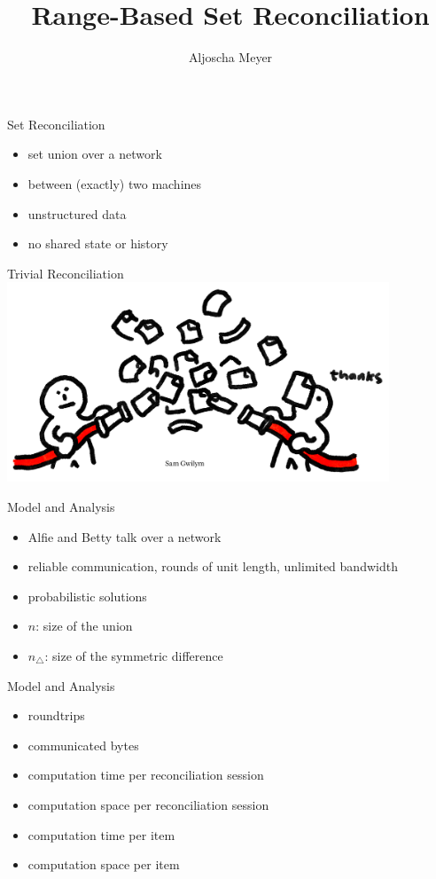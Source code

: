 \documentclass{beamer}
\title[RBSR]{Range-Based Set Reconciliation}
\author{Aljoscha Meyer}
\date{}
\begin{document}
\frame{\titlepage}

\begin{frame}{Set Reconciliation}
    \begin{itemize}
        \item set union over a network
        \item between (exactly) two machines
        \item unstructured data
        \item no shared state or history
    \end{itemize}
\end{frame}

\begin{frame}{Trivial Reconciliation}
    \includegraphics[keepaspectratio=true,width=11.4cm]{trivial_sync.png}
\end{frame}

\begin{frame}{Model and Analysis}
    \begin{itemize}
        \item Alfie and Betty talk over a network
        \item reliable communication, rounds of unit length, unlimited bandwidth
        \item probabilistic solutions \pause
        \item $n$: size of the union
        \item $n_{\triangle}$: size of the symmetric difference
    \end{itemize}
\end{frame}

\begin{frame}{Model and Analysis}
    \begin{itemize}
        \item roundtrips
        \item communicated bytes
        \item computation time per reconciliation session
        \item computation space per reconciliation session
        \item computation time per item
        \item computation space per item
    \end{itemize}
\end{frame}
\end{document}
